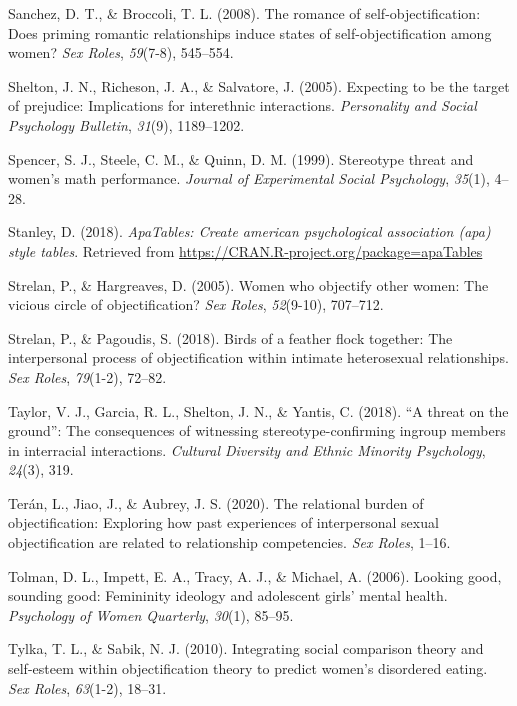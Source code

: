 \documentclass[man]{apa6}
\begin{document}
\hypertarget{ref-sanchez2008romance}{}
Sanchez, D. T., \& Broccoli, T. L. (2008). The romance of
self-objectification: Does priming romantic relationships induce states
of self-objectification among women? \emph{Sex Roles}, \emph{59}(7-8),
545--554.

\hypertarget{ref-shelton2005expecting}{}
Shelton, J. N., Richeson, J. A., \& Salvatore, J. (2005). Expecting to
be the target of prejudice: Implications for interethnic interactions.
\emph{Personality and Social Psychology Bulletin}, \emph{31}(9),
1189--1202.

\hypertarget{ref-spencer1999stereotype}{}
Spencer, S. J., Steele, C. M., \& Quinn, D. M. (1999). Stereotype threat
and women's math performance. \emph{Journal of Experimental Social
Psychology}, \emph{35}(1), 4--28.

\hypertarget{ref-R-apaTables}{}
Stanley, D. (2018). \emph{ApaTables: Create american psychological
association (apa) style tables}. Retrieved from
\url{https://CRAN.R-project.org/package=apaTables}

\hypertarget{ref-strelan2005women}{}
Strelan, P., \& Hargreaves, D. (2005). Women who objectify other women:
The vicious circle of objectification? \emph{Sex Roles},
\emph{52}(9-10), 707--712.

\hypertarget{ref-strelan2018birds}{}
Strelan, P., \& Pagoudis, S. (2018). Birds of a feather flock together:
The interpersonal process of objectification within intimate
heterosexual relationships. \emph{Sex Roles}, \emph{79}(1-2), 72--82.

\hypertarget{ref-taylor2018threat}{}
Taylor, V. J., Garcia, R. L., Shelton, J. N., \& Yantis, C. (2018). ``A
threat on the ground'': The consequences of witnessing
stereotype-confirming ingroup members in interracial interactions.
\emph{Cultural Diversity and Ethnic Minority Psychology}, \emph{24}(3),
319.

\hypertarget{ref-teran2020relational}{}
Terán, L., Jiao, J., \& Aubrey, J. S. (2020). The relational burden of
objectification: Exploring how past experiences of interpersonal sexual
objectification are related to relationship competencies. \emph{Sex
Roles}, 1--16.

\hypertarget{ref-tolman2006looking}{}
Tolman, D. L., Impett, E. A., Tracy, A. J., \& Michael, A. (2006).
Looking good, sounding good: Femininity ideology and adolescent girls'
mental health. \emph{Psychology of Women Quarterly}, \emph{30}(1),
85--95.

\hypertarget{ref-tylka2010integrating}{}
Tylka, T. L., \& Sabik, N. J. (2010). Integrating social comparison
theory and self-esteem within objectification theory to predict women's
disordered eating. \emph{Sex Roles}, \emph{63}(1-2), 18--31.
\end{document}
